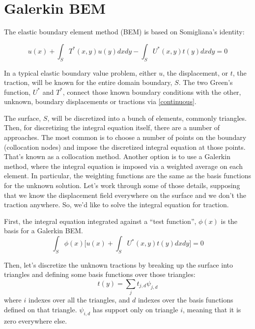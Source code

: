 \documentclass{article}
\begin{document}
\section{Galerkin BEM}

The elastic boundary element method (BEM) is based on Somigliana's identity:

\begin{equation}
    u(x) +
    \int_{S} T^*(x,y) u(y) dx dy -
    \int_{S} U^*(x,y) t(y) dx dy = 0
\end{equation}

In a typical elastic boundary value problem, either $u$, the displacement, or $t$, the traction, will be known for the entire domain boundary, $S$. The two Green's function, $U^*$ and $T^*$, connect those known boundary conditions with the other, unknown, boundary displacements or tractions via \ref{continuous}.

The surface, $S$, will be discretized into a bunch of elements, commonly triangles. Then, for discretizing the integral equation itself, there are a number of approaches.  The most common is to choose a number of points on the boundary (collocation nodes) and impose the discretized integral equation at those points. That's known as a collocation method. Another option is to use a Galerkin method, where the integral equation is imposed via a weighted average on each element. In particular, the weighting functions are the same as the basis functions for the unknown solution. Let's work through some of those details, supposing that we know the displacement field everywhere on the surface and we don't the traction anywhere. So, we'd like to solve the integral equation for traction.

First, the integral equation integrated against a ``test function'', $\phi(x)$ is the basis for a Galerkin BEM.
\begin{equation}
    \int_{S} \phi(x) \Big[ u(x) +
\int_{S} U^*(x,y) t(y) dx dy \Big] = 0
\end{equation}

Then, let's discretize the unknown tractions by breaking up the surface into triangles and defining some basis functions over those triangles: 
\begin{equation}
    t(y) = \sum_{j} t_{j,d} \psi_{j,d}
\end{equation}
where $i$ indexes over all the triangles, and $d$ indexes over the basis functions defined on that triangle. $\psi_{i,d}$ has support only on triangle $i$, meaning that it is zero everywhere else.
\end{document}
